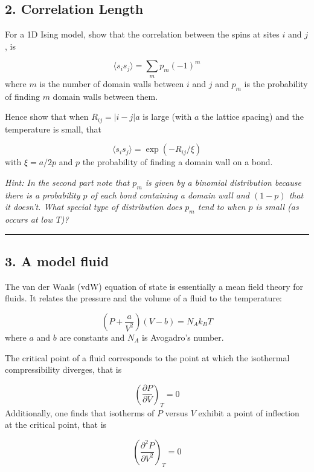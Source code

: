 \documentclass[
  letterpaper,
  enabledeprecatedfontcommands]{report}
\begin{document}
\subsection*{2. Correlation Length}\label{correlation-length}

For a 1D Ising model, show that the correlation between the spins at
sites \(i\) and \(j\), is

\[\langle s_i s_j\rangle =\sum_m p_m(-1)^m\] where \(m\) is the number
of domain walls between \(i\) and \(j\) and \(p_m\) is the probability
of finding \(m\) domain walls between them.

Hence show that when \(R_{ij}=|i-j|a\) is large (with \(a\) the lattice
spacing) and the temperature is small, that

\[\langle s_i s_j\rangle =\exp(-R_{ij}/\xi)\] with \(\xi=a/2p\) and
\(p\) the probability of finding a domain wall on a bond.

\emph{Hint: In the second part note that \(p_m\) is given by a binomial
distribution because there is a probability \(p\) of each bond
containing a domain wall and \((1-p)\) that it doesn't. What special
type of distribution does \(p_m\) tend to when \(p\) is small (as occurs
at low \(T\))?}

\begin{center}\rule{0.5\linewidth}{0.5pt}\end{center}

\subsection*{3. A model fluid}\label{a-model-fluid}

The van der Waals (vdW) equation of state is essentially a mean field
theory for fluids. It relates the pressure and the volume of a fluid to
the temperature:

\[\left(P+\frac{a}{V^2}\right)(V-b)=N_Ak_BT\] where \(a\) and \(b\) are
constants and \(N_A\) is Avogadro's number.

The critical point of a fluid corresponds to the point at which the
isothermal compressibility diverges, that is

\[\left(\frac{\partial P}{\partial V}\right)_T=0\] Additionally, one
finds that isotherms of \(P\) versus \(V\) exhibit a point of inflection
at the critical point, that is

\[\left(\frac{\partial^2 P}{\partial V^2}\right)_T=0\]
\end{document}
